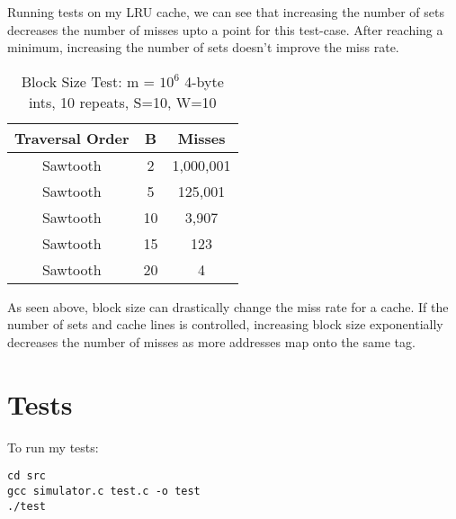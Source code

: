 \documentclass{article}
\begin{document}
\noindent Running tests on my LRU cache, we can see that increasing the number of sets decreases the number of misses upto a point for this test-case. After reaching a minimum, increasing the number of sets doesn't improve the miss rate.

\begin{table}[H]
\centering
\captionsetup{labelformat=empty}
\caption{Block Size Test: m = $10^6$ 4-byte ints, 10 repeats, S=10, W=10}
\begin{tabular}{|c|c|c|}
\hline
Traversal Order & B & Misses  \\
\hline
Sawtooth & 2 & 1,000,001 \\
\hline
Sawtooth & 5 & 125,001 \\
\hline
Sawtooth & 10 & 3,907 \\
\hline
Sawtooth & 15 & 123 \\
\hline
Sawtooth & 20 & 4 \\
\hline
\end{tabular}
\end{table}

\noindent As seen above, block size can drastically change the miss rate for a cache. If the number of sets and cache lines is controlled, increasing block size exponentially decreases the number of misses as more addresses map onto the same tag.

\section{Tests}

To run my tests:
\begin{verbatim}
cd src
gcc simulator.c test.c -o test
./test
\end{verbatim}
\end{document}
